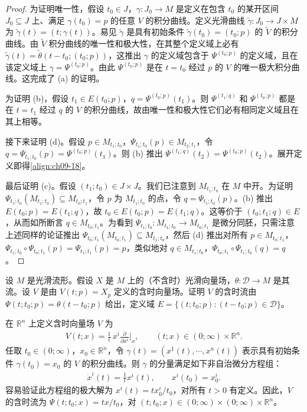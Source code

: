 \documentclass[../../main.tex]{subfiles}
\begin{document}
\begin{proof}
为证明唯一性，假设 $t_0\in J$，$\gamma\colon J_0\to M$ 是定义在包含 $t_0$ 的某开区间 $J_0\subseteq J$ 上、满足 $\gamma(t_0)=p$ 的任意 $V$ 的积分曲线。定义光滑曲线 $\widetilde{\gamma}\colon J_0\to J\times M$ 为 $\widetilde{\gamma}(t)=(t;\gamma(t))$。易见 $\widetilde{\gamma}$ 是具有初始条件 $\widetilde{\gamma}(t_0)=(t_0;p)$ 的 $\widetilde{V}$ 的积分曲线。由 $\widetilde{V}$ 积分曲线的唯一性和极大性，在其整个定义域上必有 $\widetilde{\gamma}(t)=\widetilde{\theta}(t-t_0;(t_0;p))$，这推出 $\gamma$ 的定义域包含于 $\Psi^{(t_0;p)}$ 的定义域，且在该定义域上 $\gamma=\Psi^{(t_0;p)}$。由此 $\Psi^{(t_0;p)}$ 是在 $t=t_0$ 经过 $p$ 的 $V$ 的唯一极大积分曲线。这完成了 (a) 的证明。

为证明 (b)，假设 $t_1\in E(t_0;p)$，$q=\Psi^{(t_0;p)}(t_1)$。则 $\Psi^{(t_1;q)}$ 和 $\Psi^{(t_0;p)}$ 都是在 $t=t_1$ 经过 $q$ 的 $V$ 的积分曲线，故由唯一性和极大性它们必有相同定义域且在其上相等。

接下来证明 (d)。假设 $p\in M_{t_1;t_0}$，$\Psi_{t_1;t_0}(p)\in M_{t_2;t_1}$，令 $q=\Psi_{t_1;t_0}(p)=\Psi^{(t_0;p)}(t_1)$。则 (b) 推出 $\Psi^{(t_1;q)}(t_2)=\Psi^{(t_0;p)}(t_2)$。展开定义即得\eqref{align:ch09-18}。

最后证明 (c)。假设 $(t_1;t_0)\in J\times J$。我们已注意到 $M_{t_1;t_0}$ 在 $M$ 中开。为证明 $\Psi_{t_1;t_0}(M_{t_1;t_0})\subseteq M_{t_0;t_1}$，令 $p$ 为 $M_{t_1;t_0}$ 的点，令 $q=\Psi_{t_1;t_0}(p)$。(b) 推出 $E(t_0;p)=E(t_1;q)$，故 $t_0\in E(t_0;p)=E(t_1;q)$。这等价于 $(t_0;t_1;q)\in E$，从而如所断言 $q\in M_{t_0;t_1}$。为看到 $\Psi_{t_1;t_0}\colon M_{t_1;t_0}\to M_{t_0;t_1}$ 是微分同胚，只需注意上述同样的论证推出 $\Psi_{t_0;t_1}(M_{t_0;t_1})\subseteq M_{t_1;t_0}$，然后 (d) 推出对所有 $p\in M_{t_0;t_1}$，$\Psi_{t_1;t_0}\circ\Psi_{t_0;t_1}(p)=\Psi_{t_1;t_1}(p)=p$，类似地对 $q\in M_{t_1;t_0}$，$\Psi_{t_0;t_1}\circ\Psi_{t_1;t_0}(q)=q$。
\end{proof}

\begin{exercise}\label{exercise:ch09-49}
设 $M$ 是光滑流形。假设 $X$ 是 $M$ 上的（不含时）光滑向量场，$\theta\colon\mathscr{D}\to M$ 是其流。设 $V$ 是由 $V(t;p)=X_p$ 定义的含时向量场。证明 $V$ 的含时流由 $\Psi(t;t_0;p)=\theta(t-t_0;p)$ 给出，定义域 $E=\{(t;t_0;p):(t-t_0;p)\in\mathscr{D}\}$。
\end{exercise}

\begin{example}\label{example:ch09-50}
在 $\mathbb{R}^n$ 上定义含时向量场 $V$ 为
\begin{align*}
V(t;x)=\frac1t\,x^i\frac{\partial}{\partial x^i}\bigg|_x,\qquad (t;x)\in(0;\infty)\times\mathbb{R}^n.
\end{align*}
任取 $t_0\in(0;\infty)$，$x_0\in\mathbb{R}^n$，令 $\gamma(t)=(x^1(t),\cdots ,x^n(t))$ 表示具有初始条件 $\gamma(t_0)=x_0$ 的 $V$ 的积分曲线。则 $\gamma$ 的分量满足如下非自治微分方程组：
\begin{align*}
\dot{x}^i(t)=\frac1t x^i(t),\qquad x^i(t_0)=x^i_0.
\end{align*}
容易验证此方程组的极大解为 $x^i(t)=tx^i_0/t_0$，对所有 $t>0$ 有定义。因此，$V$ 的含时流为 $\Psi(t;t_0;x)=tx/t_0$，对 $(t;t_0;x)\in(0;\infty)\times(0;\infty)\times\mathbb{R}^n$。
\end{example}
\end{document}

